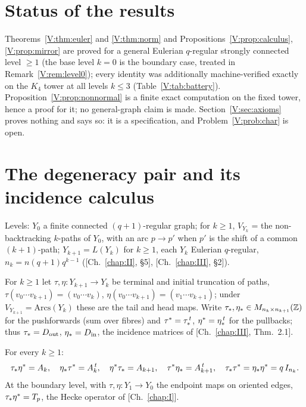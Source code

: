 \section*{Status of the results}

Theorems~\ref{V:thm:euler} and \ref{V:thm:norm} and Propositions~\ref{V:prop:calculus},
\ref{V:prop:mirror} are proved for a general Eulerian $q$-regular strongly connected
level $\ge1$ (the base level $k=0$ is the boundary case, treated in
Remark~\ref{V:rem:level0}); every identity was additionally machine-verified exactly on
the $K_4$ tower at all levels $k\le3$ (Table~\ref{V:tab:battery}).
Proposition~\ref{V:prop:nonnormal} is a finite exact computation on the fixed tower,
hence a proof for it; no general-graph claim is made. Section~\ref{V:sec:axioms} proves
nothing and says so: it is a specification, and Problem~\ref{V:prob:char} is open.

\section{The degeneracy pair and its incidence calculus}\label{V:sec:calculus}

Levels: $Y_0$ a finite connected $(q+1)$-regular graph; for $k\ge1$, $V_{Y_k}$ = the
non-backtracking $k$-paths of $Y_0$, with an arc $p\to p'$ when $p'$ is the shift of a
common $(k{+}1)$-path; $Y_{k+1}=L(Y_k)$ for $k\ge1$, each $Y_k$ Eulerian $q$-regular,
$n_k=n(q+1)q^{k-1}$ ([Ch.~\ref{chap:II}, \S5], [Ch.~\ref{chap:III}, \S2]).

\begin{definition}\label{V:def:degen}
For $k\ge1$ let $\tau,\eta\colon Y_{k+1}\to Y_k$ be terminal and initial truncation of
paths, $\tau(v_0\cdots v_{k+1})=(v_0\cdots v_k)$, $\eta(v_0\cdots v_{k+1})
=(v_1\cdots v_{k+1})$; under $V_{Y_{k+1}}=\mathrm{Arcs}(Y_k)$ these are the tail and
head maps. Write $\tau_*,\eta_*\in M_{n_k\times n_{k+1}}(\mathbb{Z})$ for the pushforwards (sum over
fibres) and $\tau^*=\tau_*^{\,t}$, $\eta^*=\eta_*^{\,t}$ for the pullbacks; thus
$\tau_*=D_{\mathrm{out}}$, $\eta_*=D_{\mathrm{in}}$, the incidence matrices of
[Ch.~\ref{chap:III}, Thm.~2.1].
\end{definition}

\begin{proposition}\label{V:prop:calculus}
For every $k\ge1$:
\[
\tau_*\eta^*=A_k,\quad \eta_*\tau^*=A_k^{\,t},\quad \eta^*\tau_*=A_{k+1},\quad \tau^*\eta_*=A_{k+1}^{\,t},
\quad \tau_*\tau^*=\eta_*\eta^*=q\,I_{n_k}.
\]
At the boundary level, with $\tau,\eta\colon Y_1\to Y_0$ the endpoint maps on oriented
edges, $\tau_*\eta^*=T_p$, the Hecke operator of {\rm[Ch.~\ref{chap:I}]}.
\end{proposition}

